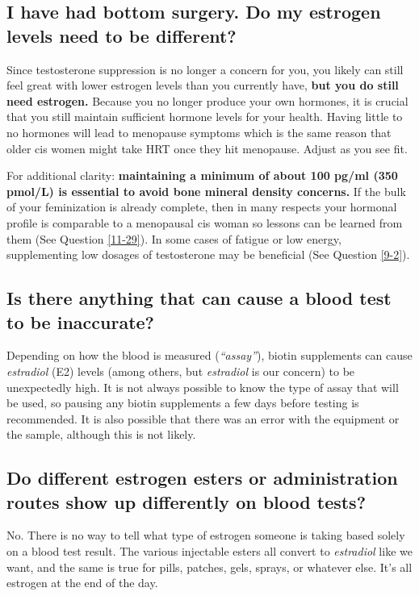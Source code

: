 \documentclass{article}
\begin{document}
{{\subsection{I have had bottom surgery. Do my estrogen levels need to be different?}

Since testosterone suppression is no longer a concern for you, you likely can still feel great with lower estrogen levels than you currently have, \textbf{but you do still need estrogen.} Because you no longer produce your own hormones, it is crucial that you still maintain sufficient hormone levels for your health. Having little to no hormones will lead to menopause symptoms which is the same reason that older cis women might take HRT once they hit menopause. Adjust as you see fit.

For additional clarity: \textbf{maintaining a minimum of about 100 pg/ml (350 pmol/L) is essential to avoid bone mineral density concerns.} If the bulk of your feminization is already complete, then in many respects your hormonal profile is comparable to a menopausal cis woman so lessons can be learned from them (See Question \ref{11-29}). In some cases of fatigue or low energy, supplementing low dosages of testosterone may be beneficial (See Question \ref{9-2}).

\subsection{Is there anything that can cause a blood test to be inaccurate?}

Depending on how the blood is measured (\textit{“assay”}), biotin supplements can cause \textit{estradiol} (E2) levels (among others, but \textit{estradiol }is our concern) to be unexpectedly high. It is not always possible to know the type of assay that will be used, so pausing any biotin supplements a few days before testing is recommended. It is also possible that there was an error with the equipment or the sample, although this is not likely.

\subsection{Do different estrogen esters or administration routes show up differently on blood tests?}\label{4-16}

No. There is no way to tell what type of estrogen someone is taking based solely on a blood test result. The various injectable esters all convert to \textit{estradiol }like we want, and the same is true for pills, patches, gels, sprays, or whatever else. It's all estrogen at the end of the day.

}}
\end{document}
